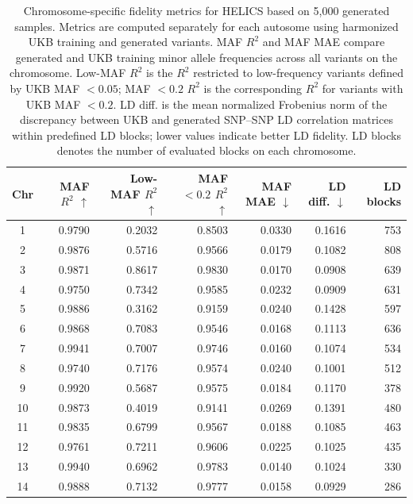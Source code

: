 \documentclass{article}
\begin{document}
\begin{table}[t]
\centering
\caption{
Chromosome-specific fidelity metrics for HELICS based on 5{,}000 generated samples. Metrics are computed separately for each autosome using harmonized UKB training and generated variants. MAF \(R^2\) and MAF MAE compare generated and UKB training minor allele frequencies across all variants on the chromosome. Low-MAF \(R^2\) is the \(R^2\) restricted to low-frequency variants defined by UKB MAF \(<0.05\); MAF \(<0.2\) \(R^2\) is the corresponding \(R^2\) for variants with UKB MAF \(<0.2\). LD diff. is the mean normalized Frobenius norm of the discrepancy between UKB and generated SNP--SNP LD correlation matrices within predefined LD blocks; lower values indicate better LD fidelity. LD blocks denotes the number of evaluated blocks on each chromosome.
}
\label{tab:chromosome_specific_fidelity_helics}
\small
\setlength{\tabcolsep}{4pt}
\renewcommand{\arraystretch}{0.95}
\begin{tabular}{c r r r r r r}
\toprule
\textbf{Chr}
& \textbf{MAF \(R^2\) \(\uparrow\)}
& \textbf{Low-MAF \(R^2\) \(\uparrow\)}
& \textbf{MAF \(<0.2\) \(R^2\) \(\uparrow\)}
& \textbf{MAF MAE \(\downarrow\)}
& \textbf{LD diff. \(\downarrow\)}
& \textbf{LD blocks} \\
\midrule
1  & 0.9790 & 0.2032 & 0.8503 & 0.0330 & 0.1616 & 753 \\
2  & 0.9876 & 0.5716 & 0.9566 & 0.0179 & 0.1082 & 808 \\
3  & 0.9871 & 0.8617 & 0.9830 & 0.0170 & 0.0908 & 639 \\
4  & 0.9750 & 0.7342 & 0.9585 & 0.0232 & 0.0909 & 631 \\
5  & 0.9886 & 0.3162 & 0.9159 & 0.0240 & 0.1428 & 597 \\
6  & 0.9868 & 0.7083 & 0.9546 & 0.0168 & 0.1113 & 636 \\
7  & 0.9941 & 0.7007 & 0.9746 & 0.0160 & 0.1074 & 534 \\
8  & 0.9740 & 0.7176 & 0.9574 & 0.0240 & 0.1001 & 512 \\
9  & 0.9920 & 0.5687 & 0.9575 & 0.0184 & 0.1170 & 378 \\
10 & 0.9873 & 0.4019 & 0.9141 & 0.0269 & 0.1391 & 480 \\
11 & 0.9835 & 0.6799 & 0.9567 & 0.0188 & 0.1085 & 463 \\
12 & 0.9761 & 0.7211 & 0.9606 & 0.0225 & 0.1025 & 435 \\
13 & 0.9940 & 0.6962 & 0.9783 & 0.0140 & 0.1024 & 330 \\
14 & 0.9888 & 0.7132 & 0.9777 & 0.0158 & 0.0929 & 286 \\

\end{tabular}
\end{table}
\end{document}
